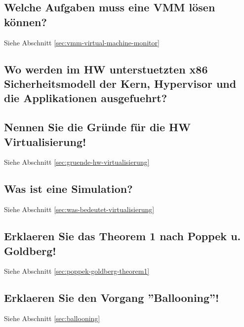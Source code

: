 \subsection{Welche Aufgaben muss eine VMM lösen können?}
Siehe Abschnitt \ref{sec:vmm-virtual-machine-monitor}

\subsection{Wo werden im HW unterstuetzten x86 Sicherheitsmodell der Kern, Hypervisor und die Applikationen ausgefuehrt?}


\subsection{Nennen Sie die Gründe für die HW Virtualisierung!}
Siehe Abschnitt \ref{sec:gruende-hw-virtualisierung}

\subsection{Was ist eine Simulation?}
Siehe Abschnitt \ref{sec:was-bedeutet-virtualisierung}

\subsection{Erklaeren Sie das Theorem 1 nach Poppek u. Goldberg!}
Siehe Abschnitt \ref{sec:poppek-goldberg-theorem1}

\subsection{Erklaeren Sie den Vorgang ''Ballooning''!}
Siehe Abschnitt \ref{sec:ballooning}